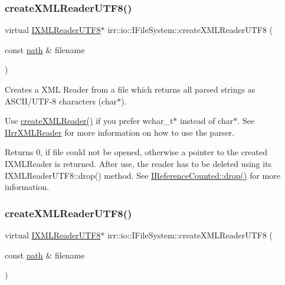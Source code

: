 \subsubsection{\texorpdfstring{create\+X\+M\+L\+Reader\+U\+T\+F8()}{createXMLReaderUTF8()}\hspace{0.1cm}{\footnotesize\ttfamily [1/4]}}
{\footnotesize\ttfamily virtual \hyperlink{namespaceirr_1_1io_a87616ca0bcc3d6424d2c2edfcb743193}{I\+X\+M\+L\+Reader\+U\+T\+F8}$\ast$ irr\+::io\+::\+I\+File\+System\+::create\+X\+M\+L\+Reader\+U\+T\+F8 (\begin{DoxyParamCaption}\item[{const \hyperlink{namespaceirr_1_1io_a6468281622ce3a1c46b72e19f32dded5}{path} \&}]{filename }\end{DoxyParamCaption})\hspace{0.3cm}{\ttfamily [pure virtual]}}



Creates a X\+ML Reader from a file which returns all parsed strings as A\+S\+C\+I\+I/\+U\+T\+F-\/8 characters (char$\ast$). 

Use \hyperlink{classirr_1_1io_1_1IFileSystem_a167c9fa159d16ee5c56c074636b0865e}{create\+X\+M\+L\+Reader()} if you prefer wchar\+\_\+t$\ast$ instead of char$\ast$. See \hyperlink{classirr_1_1io_1_1IIrrXMLReader}{I\+Irr\+X\+M\+L\+Reader} for more information on how to use the parser. \begin{DoxyReturn}{Returns}
0, if file could not be opened, otherwise a pointer to the created I\+X\+M\+L\+Reader is returned. After use, the reader has to be deleted using its I\+X\+M\+L\+Reader\+U\+T\+F8\+::drop() method. See \hyperlink{classirr_1_1IReferenceCounted_a03856a09355b89d178090c4a5f738543}{I\+Reference\+Counted\+::drop()} for more information. 
\end{DoxyReturn}
\mbox{\label{classirr_1_1io_1_1IFileSystem_affd8f622ac7c3dcd507f20f9cd23b21f}} 
\subsubsection{\texorpdfstring{create\+X\+M\+L\+Reader\+U\+T\+F8()}{createXMLReaderUTF8()}\hspace{0.1cm}{\footnotesize\ttfamily [2/4]}}
{\footnotesize\ttfamily virtual \hyperlink{namespaceirr_1_1io_a87616ca0bcc3d6424d2c2edfcb743193}{I\+X\+M\+L\+Reader\+U\+T\+F8}$\ast$ irr\+::io\+::\+I\+File\+System\+::create\+X\+M\+L\+Reader\+U\+T\+F8 (\begin{DoxyParamCaption}\item[{const \hyperlink{namespaceirr_1_1io_a6468281622ce3a1c46b72e19f32dded5}{path} \&}]{filename }\end{DoxyParamCaption})\hspace{0.3cm}{\ttfamily [pure virtual]}}



